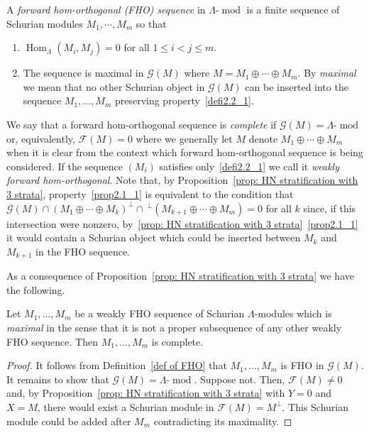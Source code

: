 \documentclass[ALCO,ThmDefs,Unicode,epreuves]{cedram}
\DeclareMathOperator{\Hom}{Hom}%
\DeclareMathOperator{\modr}{mod}
\newcommand{\cF}{\ensuremath{{\mathcal{F}}}}
\newcommand{\cG}{\ensuremath{{\mathcal{G}}}}
\begin{document}
\begin{defi}\label{def of FHO}
A \emph{forward hom-orthogonal (FHO) sequence} in $\Lambda\text{-}\modr$ is a finite sequence of Schurian modules $M_1, \cdots, M_m$ so that
\begin{enumerate}
\item\label{defi2.2_1} $\Hom_\Lambda(M_i,M_j)=0$ for all $1\le i<j\le m$.
\item\label{defi2.2_2} The sequence is maximal in $\cG(M)$ where $M=M_1\oplus \cdots\oplus M_m$. By \emph{maximal} we mean that no other Schurian object in $\cG(M)$ can be inserted into the sequence $M_1,\ldots,M_m$ preserving property~\eqref{defi2.2_1}.
\end{enumerate}
We say that a forward hom-orthogonal sequence is \emph{complete} if $\cG(M)=\Lambda\text{-}\modr$ or, equivalently, $\cF(M)=0$ where we generally let $M$ denote $M_1\oplus\cdots\oplus M_m$ when it is clear from the context which forward hom-orthogonal sequence is being considered. If the sequence $(M_i)$ satisfies only~\eqref{defi2.2_1} we call it \emph{weakly forward hom-orthogonal}. Note that, by Proposition~\ref{prop: HN stratification with 3 strata}, property~\eqref{prop2.1_1} is equivalent to the condition that $\cG(M)\cap(M_1\oplus \cdots \oplus M_k)^\perp\cap\,^\perp(M_{k+1}\oplus\cdots\oplus M_m)=0$ for all $k$ since, if this intersection were nonzero, by~\ref{prop: HN stratification with 3 strata}~\eqref{prop2.1_1} it would contain a Schurian object which could be inserted between $M_k$ and $M_{k+1}$ in the FHO sequence.
\end{defi}

As a consequence of Proposition~\ref{prop: HN stratification with 3 strata} we have the following.


\begin{coro}\label{cor: max weakly forward hom-orth is complete}
Let $M_1,\ldots,M_m$ be a weakly FHO sequence of Schurian $\Lambda$-modules which is \emph{maximal} in the sense that it is not a proper subsequence of any other weakly FHO sequence. Then $M_1,\ldots,M_m$ is complete.
\end{coro}

\begin{proof}
It follows from Definition~\ref{def of FHO} that $M_1,\ldots,M_m$ is FHO in $\cG(M)$. It remains to show that $\cG(M)=\Lambda\text{-}\modr $. Suppose not. Then, $\cF(M)\neq0$ and, by Proposition~\ref{prop: HN stratification with 3 strata} with $Y=0$ and $X=M$, there would exist a Schurian module in $\cF(M)=M^\perp$. This Schurian module could be added after $M_m$ contradicting its maximality.
\end{proof}
\end{document}
